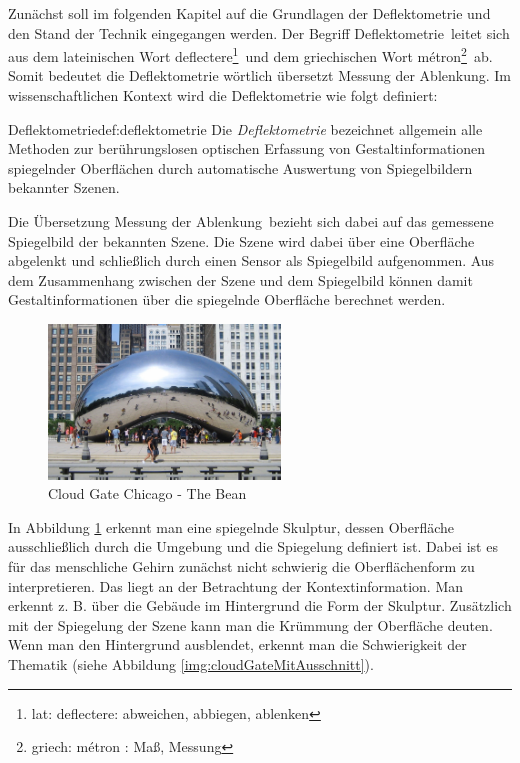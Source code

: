 Zunächst soll im folgenden Kapitel auf die Grundlagen der Deflektometrie und den Stand der Technik eingegangen werden.
Der Begriff \glqq Deflektometrie\grqq ~leitet sich aus dem lateinischen Wort \glqq deflectere\footnote{lat: deflectere: abweichen, abbiegen, ablenken}\grqq ~und dem griechischen Wort \glqq métron\footnote{griech: \textgreek{métron} : Maß, Messung}\grqq ~ab.
Somit bedeutet die Deflektometrie wörtlich übersetzt \glqq Messung der Ablenkung\grqq.
Im wissenschaftlichen Kontext wird die Deflektometrie wie folgt definiert:

\begin{Definition}{Deflektometrie}{def:deflektometrie}
	Die \textit{Deflektometrie} bezeichnet allgemein alle Methoden zur berührungslosen optischen Erfassung von Gestaltinformationen spiegelnder Oberflächen durch automatische Auswertung von Spiegelbildern bekannter Szenen. \cite{fraunhofer}
\end{Definition}

\noindent
Die Übersetzung \glqq Messung der Ablenkung\grqq ~bezieht sich dabei auf das gemessene Spiegelbild der bekannten Szene.
Die Szene wird dabei über eine Oberfläche abgelenkt und schließlich durch einen Sensor als Spiegelbild aufgenommen.
Aus dem Zusammenhang zwischen der Szene und dem Spiegelbild können damit Gestaltinformationen über die spiegelnde Oberfläche berechnet werden.

\begin{figure}[H]
	\centering
	\includegraphics[width=0.55\textwidth]{02_grundlagenDerDeflektometrie/figures/cloud-gate-chicago}
	\caption[Cloud Gate Chicaog - The Bean]{Cloud Gate Chicago - The Bean \cite{cloudGateChicago}}
	\label{img:cloudGateChicago}
\end{figure}

\noindent
In Abbildung \ref{img:cloudGateChicago} erkennt man eine spiegelnde Skulptur, dessen Oberfläche ausschließlich durch die Umgebung und die Spiegelung definiert ist.
Dabei ist es für das menschliche Gehirn zunächst nicht schwierig die Oberflächenform zu interpretieren.
Das liegt an der Betrachtung der Kontextinformation.
Man erkennt z. B. über die Gebäude im Hintergrund die Form der Skulptur.
Zusätzlich mit der Spiegelung der Szene kann man die Krümmung der Oberfläche deuten.
Wenn man den Hintergrund ausblendet, erkennt man die Schwierigkeit der Thematik (siehe Abbildung \ref{img:cloudGateMitAusschnitt}).


